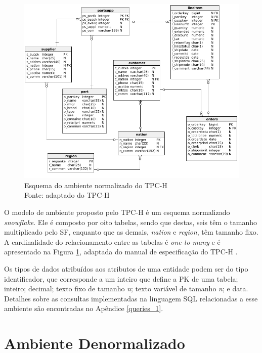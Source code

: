 \begin{figure}[htpb]
	\centering
		\includegraphics[width=\textwidth]{img/snow_flake.png}
	\caption[Esquema do ambiente normalizado do TPC-H]
		{Esquema do ambiente normalizado do TPC-H \\ Fonte: adaptado do TPC-H \cite{tpc2017specs}}
	\label{fig:snow_flake}
\end{figure}


O modelo de ambiente proposto pelo TPC-H é um esquema normalizado \textit{snowflake}. Ele é composto por oito tabelas, sendo que destas, seis têm o tamanho multiplicado pelo SF, enquanto que as demais, \textit{nation} e \textit{region}, têm tamanho fixo. A cardinalidade do relacionamento entre as tabelas é \textit{one-to-many} e é apresentado na Figura \ref{fig:snow_flake}, adaptada do manual de especificação do TPC-H \cite{tpc2017specs}.

Os tipos de dados atribuídos aos atributos de uma entidade podem ser do tipo identificador, que corresponde a um inteiro que define a PK de uma tabela; inteiro; decimal; texto fixo de tamanho \textit{n}; texto variável de tamanho \textit{n}; e data. Detalhes sobre as consultas implementadas na linguagem SQL relacionadas a esse ambiente são encontradas no Apêndice \ref{queries_1}.

\section{Ambiente Denormalizado}

